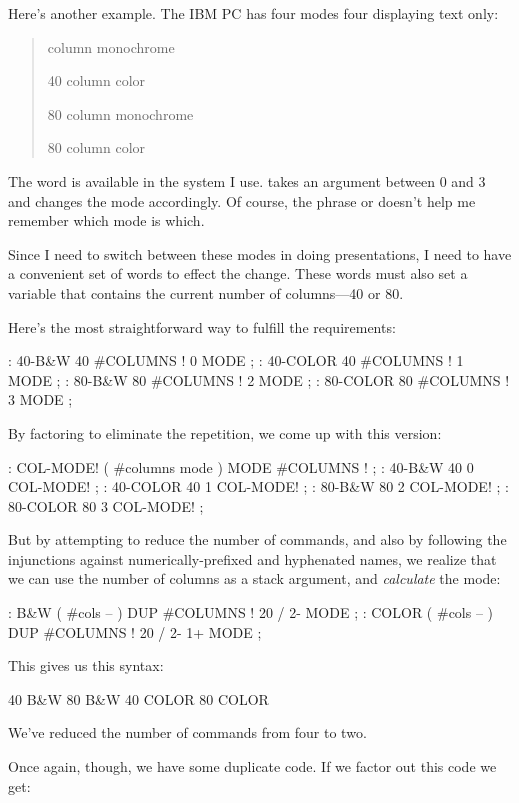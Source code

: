 Here's another example. The IBM PC has four modes four displaying text
only:

\begin{quote} column monochrome

40 column color

80 column monochrome

80 column color
\end{quote}
The word  is available in the \Forth{} system I use.
 takes an argument between 0 and 3 and changes the mode
accordingly. Of course, the phrase  or 
doesn't help me remember which mode is which.

Since I need to switch between these modes in doing presentations, I
need to have a convenient set of words to effect the change. These
words must also set a variable that contains the current number of
columns---40 or 80.

Here's the most straightforward way to fulfill the requirements:

\begin{Code}
: 40-B&W       40 #COLUMNS !  0 MODE ;
: 40-COLOR     40 #COLUMNS !  1 MODE ;
: 80-B&W       80 #COLUMNS !  2 MODE ;
: 80-COLOR     80 #COLUMNS !  3 MODE ;
\end{Code}
By factoring to eliminate the repetition, we come up with this version:

\begin{Code}
: COL-MODE!     ( #columns mode )  MODE  #COLUMNS ! ;
: 40-B&W       40 0 COL-MODE! ;
: 40-COLOR     40 1 COL-MODE! ;
: 80-B&W       80 2 COL-MODE! ;
: 80-COLOR     80 3 COL-MODE! ;
\end{Code}
But by attempting to reduce the number of commands, and also by
following the injunctions against numerically-prefixed and hyphenated
names, we realize that we can use the number of columns as a stack
argument, and \emph{calculate} the mode:

\begin{Code}
: B&W    ( #cols -- )  DUP #COLUMNS !  20 /  2-     MODE ;
: COLOR  ( #cols -- )  DUP #COLUMNS !  20 /  2-  1+ MODE ;
\end{Code}
This gives us this syntax:

\begin{Code}
40 B&W
80 B&W
40 COLOR
80 COLOR
\end{Code}
We've reduced the number of commands from four to two.

Once again, though, we have some duplicate code. If we factor out this
code we get:

